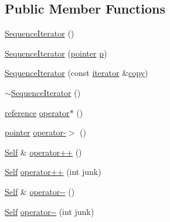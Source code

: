 \subsection*{Public Member Functions}
\begin{DoxyCompactItemize}
\item 
\hyperlink{structprism_1_1_sequence_iterator_a79834d7c3eed7825d784cd3f9e9cbe35}{Sequence\+Iterator} ()
\item 
\hyperlink{structprism_1_1_sequence_iterator_aa2c2b6ea87adefd00554b90f78e49419}{Sequence\+Iterator} (\hyperlink{structprism_1_1_sequence_iterator_a024492122445836e94097e10b02b700a}{pointer} \hyperlink{structprism_1_1_sequence_iterator_aea1d104b7fda3ca8899fefa896fa59e6}{p})
\item 
\hyperlink{structprism_1_1_sequence_iterator_a071cbca99558550e5921a31f8a12a1b8}{Sequence\+Iterator} (const \hyperlink{structprism_1_1_sequence_iterator_ac791d493ea5fafcc435a83dbe2385a1e}{iterator} \&\hyperlink{namespaceprism_ae776f4cd825f79e7af1cf6ee1d90a209}{copy})
\item 
\hyperlink{structprism_1_1_sequence_iterator_a1054dee492323413c49ee157be9d36e2}{$\sim$\+Sequence\+Iterator} ()
\item 
\hyperlink{structprism_1_1_sequence_iterator_a4039950f81c7604c1dba682faddf5652}{reference} \hyperlink{structprism_1_1_sequence_iterator_a2a6cb209944cb43cbd2f90be97eb5b36}{operator$\ast$} ()
\item 
\hyperlink{structprism_1_1_sequence_iterator_a024492122445836e94097e10b02b700a}{pointer} \hyperlink{structprism_1_1_sequence_iterator_a21d21324636a334a981021d54c200949}{operator-\/$>$} ()
\item 
\hyperlink{structprism_1_1_sequence_iterator_a795689f7bf3a16b6c40cfc81879467b2}{Self} \& \hyperlink{structprism_1_1_sequence_iterator_af331b5bc9256eebb873e095a76689c59}{operator++} ()
\item 
\hyperlink{structprism_1_1_sequence_iterator_a795689f7bf3a16b6c40cfc81879467b2}{Self} \hyperlink{structprism_1_1_sequence_iterator_ad2b77b3c64e1c3fd0577ca74faac7209}{operator++} (int junk)
\item 
\hyperlink{structprism_1_1_sequence_iterator_a795689f7bf3a16b6c40cfc81879467b2}{Self} \& \hyperlink{structprism_1_1_sequence_iterator_af9a8c57ba82eb6c2b05f46294c644fe0}{operator-\/-\/} ()
\item 
\hyperlink{structprism_1_1_sequence_iterator_a795689f7bf3a16b6c40cfc81879467b2}{Self} \hyperlink{structprism_1_1_sequence_iterator_a26f87e0f93a7a793a64be34989728389}{operator-\/-\/} (int junk)

\end{DoxyCompactItemize}
